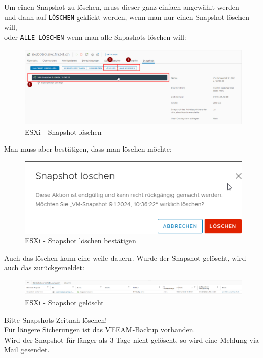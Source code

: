 {
    \begin{flushleft}
        Um einen Snapshot zu löschen, muss dieser ganz einfach angewählt werden\\
        und dann auf \texttt{LÖSCHEN} geklickt werden, wenn man nur einen Snapshot löschen will,
        \\oder \texttt{ALLE LÖSCHEN} wenn man alle Snpashots löschen will:
        \begin{figure}[H]
            \centering
            \includegraphics[width=0.5\linewidth]{source/snapshots/esxi_delete_snapshot}
            \caption{ESXi - Snapshot löschen}
            \label{fig:esxi_delete_snapshot}
        \end{figure}
    \end{flushleft}
    \begin{flushleft}
        Man muss aber bestätigen, dass man löschen möchte:
        \begin{figure}[H]
            \centering
            \includegraphics[width=0.5\linewidth]{source/snapshots/esxi_confirm_delete}
            \caption{ESXi - Snapshot löschen bestätigen}
            \label{fig:esxi_confirm_delete}
        \end{figure}
    \end{flushleft}
    \begin{flushleft}
        Auch das löschen kann eine weile dauern.
        Wurde der Snapshot gelöscht, wird auch das zurückgemeldet:
        \begin{figure}[H]
            \centering
            \includegraphics[width=0.5\linewidth]{source/snapshots/esxi_snapshot_deleted}
            \caption{ESXi - Snapshot gelöscht}
            \label{fig:esxi_snapshot_deleted}
        \end{figure}
    \end{flushleft}
    \begin{flushleft}
        \begin{mdframed}
            Bitte Snapshots Zeitnah löschen!\\
            Für längere Sicherungen ist das \Gls{VEEAM}-Backup vorhanden.\\
            Wird der Snapshot für länger als 3 Tage nicht gelöscht, so wird eine Meldung via Mail gesendet.
        \end{mdframed}
    \end{flushleft}
}